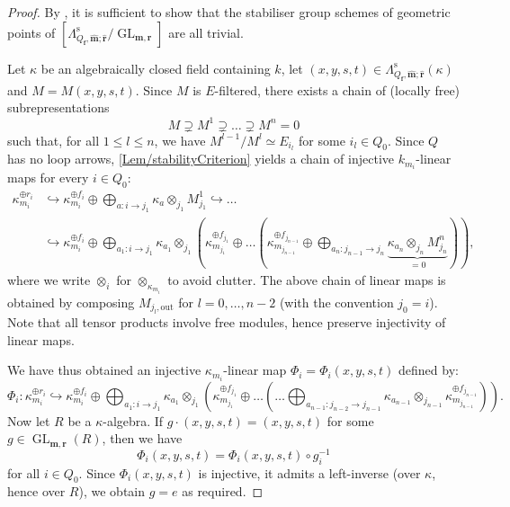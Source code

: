 \documentclass[a4paper,12pt]{article}
\theoremstyle{definition}
\theoremstyle{plain}
\theoremstyle{remark}
\DeclareMathOperator{\GL}{GL}
\newcommand{\st}{\mathrm{s}}
\newcommand\bff{\mathbf{f}}
\newcommand\bfm{\mathbf{m}}
\newcommand\bfr{\mathbf{r}}
\begin{document}
\begin{proof}
By \cite[Thm.\ 2.2.5]{Con06}, it is sufficient to show that the stabiliser group schemes of geometric points of $\left[\Lambda_{Q_\bff,\widehat{\bfm};\widehat{\bfr}}^\st/\GL_{\bfm,\bfr}\right]$ are all trivial.

Let $\kappa$ be an algebraically closed field containing $k$, let $(x,y,s,t)\in\Lambda_{Q_\bff,\widehat{\bfm};\widehat{\bfr}}^\st(\kappa)$ and $M=M(x,y,s,t)$. Since $M$ is $E$-filtered, there exists a chain of (locally free) subrepresentations
\[
M\supsetneq M^1\supsetneq\ldots\supsetneq M^n=0
\]
such that, for all $1\leq l\leq n$, we have $M^{l-1}/M^l\simeq E_{i_l}$ for some $i_l\in Q_0$. Since $Q$ has no loop arrows, \cref{Lem/stabilityCriterion} yields a chain of injective $k_{m_i}$-linear maps for every $i\in Q_0$:
\[
\begin{split}
\kappa_{m_i}^{\oplus r_i} &
\hookrightarrow
\kappa_{m_i}^{\oplus f_i}\oplus\bigoplus_{a:i\rightarrow j_1}\kappa_a\otimes_{j_1} M_{j_1}^1 \hookrightarrow \ldots \\
& \hookrightarrow
\kappa_{m_i}^{\oplus f_i}\oplus
\bigoplus_{a_1:i\rightarrow j_1}
\kappa_{a_1}\otimes_{j_1}
\left(
\kappa_{m_{j_1}}^{\oplus f_{j_1}}\oplus
\ldots
\left(
\kappa_{m_{j_{n-1}}}^{\oplus f_{j_{n-1}}}
\oplus\bigoplus_{a_n:j_{n-1}\rightarrow j_n}
\underbrace{\kappa_{a_n}\otimes_{j_n}M_{j_n}^n}_{=0}
\right)
\right)
,
\end{split}
\]
where we write $\otimes_i$ for $\otimes_{\kappa_{m_i}}$ to avoid clutter. The above chain of linear maps is obtained by composing $M_{j_l,\mathrm{out}}$ for $ l=0,\ldots, n-2$ (with the convention $j_0=i$). Note that all tensor products involve free modules, hence preserve injectivity of linear maps.

We have thus obtained an injective $\kappa_{m_i}$-linear map $\Phi_i=\Phi_i(x,y,s,t)$ defined by:
\[
\Phi_i:
\kappa_{m_i}^{\oplus r_i}
\hookrightarrow
\kappa_{m_i}^{\oplus f_i}
\oplus
\bigoplus_{a_1:i\rightarrow j_1}\kappa_{a_1}\otimes_{j_1}
\left(
\kappa_{m_{j_1}}^{\oplus f_{j_1}}
\oplus
\ldots
\left(
\ldots
\bigoplus_{a_{n-1}:j_{n-2}\rightarrow j_{n-1}}\kappa_{a_{n-1}}\otimes_{j_{n-1}}\kappa_{m_{j_{n-1}}}^{\oplus f_{j_{n-1}}}
\right)
\right)
.
\]
Now let $R$ be a $\kappa$-algebra. If $g\cdot (x,y,s,t)=(x,y,s,t)$ for some $g\in\GL_{\bfm,\bfr}(R)$, then we have
\[
\Phi_i(x,y,s,t)=\Phi_i(x,y,s,t)\circ g_i^{-1}
\]
for all $i\in Q_0$. Since $\Phi_i(x,y,s,t)$ is injective, it admits a left-inverse (over $\kappa$, hence over $R$), we obtain $g=e$ as required.
\end{proof}
\end{document}

